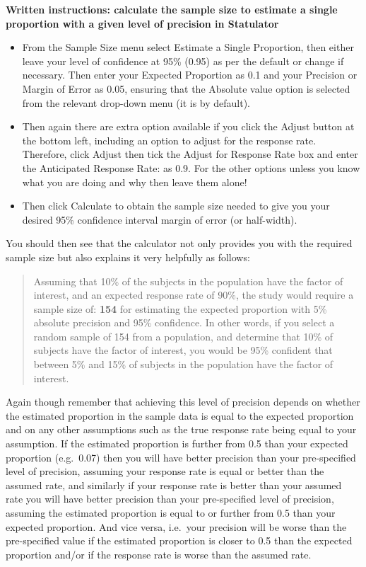 \documentclass[
]{book}
\begin{document}
\textbf{Written instructions: calculate the sample size to estimate a single proportion with a given level of precision in Statulator}

\begin{itemize}
\item
  From the Sample Size menu select Estimate a Single Proportion, then either leave your level of confidence at 95\% (0.95) as per the default or change if necessary. Then enter your Expected Proportion as 0.1 and your Precision or Margin of Error as 0.05, ensuring that the Absolute value option is selected from the relevant drop-down menu (it is by default).
\item
  Then again there are extra option available if you click the Adjust button at the bottom left, including an option to adjust for the response rate. Therefore, click Adjust then tick the Adjust for Response Rate box and enter the Anticipated Response Rate: as 0.9. For the other options unless you know what you are doing and why then leave them alone!
\item
  Then click Calculate to obtain the sample size needed to give you your desired 95\% confidence interval margin of error (or half-width).
\end{itemize}

You should then see that the calculator not only provides you with the required sample size but also explains it very helpfully as follows:

\begin{quote}
Assuming that 10\% of the subjects in the population have the factor of interest, and an expected response rate of 90\%, the study would require a sample size of: \textbf{154} for estimating the expected proportion with 5\% absolute precision and 95\% confidence. In other words, if you select a random sample of 154 from a population, and determine that 10\% of subjects have the factor of interest, you would be 95\% confident that between 5\% and 15\% of subjects in the population have the factor of interest.
\end{quote}

Again though remember that achieving this level of precision depends on whether the estimated proportion in the sample data is equal to the expected proportion and on any other assumptions such as the true response rate being equal to your assumption. If the estimated proportion is further from 0.5 than your expected proportion (e.g.~0.07) then you will have better precision than your pre-specified level of precision, assuming your response rate is equal or better than the assumed rate, and similarly if your response rate is better than your assumed rate you will have better precision than your pre-specified level of precision, assuming the estimated proportion is equal to or further from 0.5 than your expected proportion. And vice versa, i.e.~your precision will be worse than the pre-specified value if the estimated proportion is closer to 0.5 than the expected proportion and/or if the response rate is worse than the assumed rate.
\end{document}
